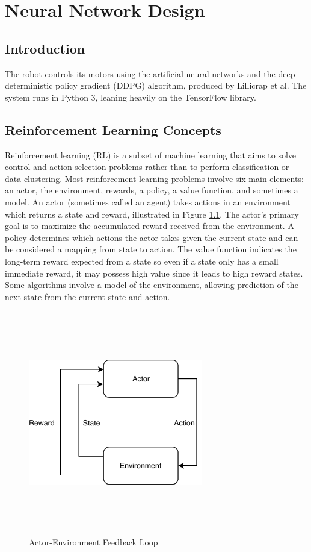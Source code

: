 \chapter{Neural Network Design}
\section{Introduction}
The robot controls its motors using the artificial neural networks and the deep deterministic policy gradient (DDPG) algorithm, produced by Lillicrap et al. The system runs in Python 3, leaning heavily on the TensorFlow library.

\section{Reinforcement Learning Concepts}
Reinforcement learning (RL) is a subset of machine learning that aims to solve control and action selection problems rather than to perform classification or data clustering. Most reinforcement learning problems involve six main elements: an actor, the environment, rewards, a policy, a value function, and sometimes a model. An actor (sometimes called an agent) takes actions in an environment which returns a state and reward, illustrated in Figure \ref{fig:actor_env_loop}. The actor's primary goal is to maximize the accumulated reward received from the environment. A policy determines which actions the actor takes given the current state and can be considered a mapping from state to action. The value function indicates the long-term reward expected from a state so even if a state only has a small immediate reward, it may possess high value since it leads to high reward states. Some algorithms involve a model of the environment, allowing prediction of the next state from the current state and action.
\begin{figure}[H]   %
	\centering \includegraphics[width=3in, height=3.85in, keepaspectratio]{figures/actor_env_loop.pdf}
	\caption{Actor-Environment Feedback Loop}\label{fig:actor_env_loop}
\end{figure}

